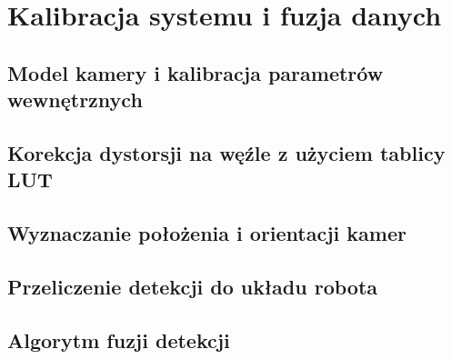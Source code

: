 \chapter{Kalibracja systemu i fuzja danych}
\label{chap:kalibracja-fuzja}

\section{Model kamery i kalibracja parametrów wewnętrznych}
\label{sec:kalibracja-wewn}

\section{Korekcja dystorsji na węźle z użyciem tablicy LUT}
\label{sec:lut}

\section{Wyznaczanie położenia i orientacji kamer}
\label{sec:kalibracja-zewn}

\section{Przeliczenie detekcji do układu robota}
\label{sec:uklad-robota}

\section{Algorytm fuzji detekcji}
\label{sec:fuzja}
